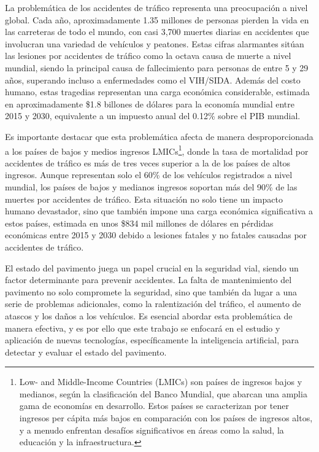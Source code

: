 
La problemática de los accidentes de tráfico representa una preocupación a nivel global. Cada año, aproximadamente 1.35 millones de personas pierden la vida en las carreteras de todo el mundo, con casi 3,700 muertes diarias en accidentes que involucran una variedad de vehículos y peatones\cite{WHO_Road_Safety}. Estas cifras alarmantes sitúan las lesiones por accidentes de tráfico como la octava causa de muerte a nivel mundial, siendo la principal causa de fallecimiento para personas de entre 5 y 29 años, superando incluso a enfermedades como el VIH/SIDA\cite{WHO_Road_Safety}. Además del costo humano, estas tragedias representan una carga económica considerable, estimada en aproximadamente \$1.8 billones de dólares para la economía mundial entre 2015 y 2030, equivalente a un impuesto anual del 0.12\% sobre el PIB mundial\cite{MACROECON_Road_Safety}.

Es importante destacar que esta problemática afecta de manera desproporcionada a los países de bajos y medios ingresos LMICs\footnote{Low- and Middle-Income Countries (LMICs) son países de ingresos bajos y medianos, según la clasificación del Banco Mundial, que abarcan una amplia gama de economías en desarrollo. Estos países se caracterizan por tener ingresos per cápita más bajos en comparación con los países de ingresos altos, y a menudo enfrentan desafíos significativos en áreas como la salud, la educación y la infraestructura.}, donde la tasa de mortalidad por accidentes de tráfico es más de tres veces superior a la de los países de altos ingresos\cite{WHO_Road_Safety}. Aunque representan solo el 60\% de los vehículos registrados a nivel mundial, los países de bajos y medianos ingresos soportan más del 90\% de las muertes por accidentes de tráfico. Esta situación no solo tiene un impacto humano devastador, sino que también impone una carga económica significativa a estos países, estimada en unos \$834 mil millones de dólares en pérdidas económicas entre 2015 y 2030 debido a lesiones fatales y no fatales causadas por accidentes de tráfico\cite{MACROECON_Road_Safety}.

El estado del pavimento juega un papel crucial en la seguridad vial, siendo un factor determinante para prevenir accidentes. La falta de mantenimiento del pavimento no solo compromete la seguridad, sino que también da lugar a una serie de problemas adicionales, como la ralentización del tráfico, el aumento de atascos y los daños a los vehículos. Es esencial abordar esta problemática de manera efectiva, y es por ello que este trabajo se enfocará en el estudio y aplicación de nuevas tecnologías, específicamente la inteligencia artificial, para detectar y evaluar el estado del pavimento.

